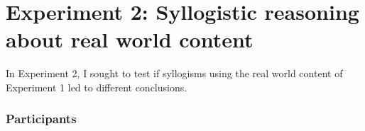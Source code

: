 \documentclass{llncs} %
\newcommand{\denote}[1]{\mbox{ $[\![ #1 ]\!]$}}
\begin{document}




\section{Experiment 2: Syllogistic reasoning about real world content}

In Experiment 2,  I sought to test if syllogisms using the real world content of Experiment 1 led to different conclusions.

\subsubsection{Participants}
\end{document}
